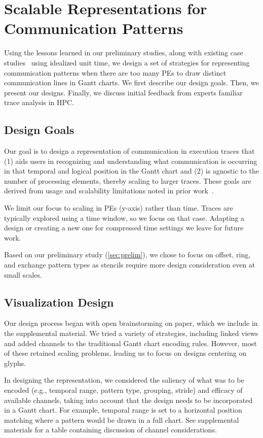\section{Scalable Representations for Communication Patterns}
\label{sec:design}

Using the lessons learned in our preliminary studies, along with existing case studies~\cite{isaacs2014combing, Isaacs2016} using idealized unit time, we design a set of strategies for representing communication patterns when there are too many PEs to draw distinct communication lines in Gantt charts. We first describe our design goals. Then, we present our designs. Finally, we discuss initial feedback from experts familiar trace analysis in HPC.


\subsection{Design Goals}

Our goal is to design a representation of communication in execution traces that (1) aids users in recognizing and understanding what communication is occurring in that temporal and logical position in the Gantt chart and (2) is agnostic to the number of processing elements, thereby scaling to larger traces. These goals are derived from usage and scalability limitations noted in prior work~\cite{isaacs2014combing}. 

We limit our focus to scaling in PEs (y-axis) rather than time. Traces are typically explored using a time window, so we focus on that case. Adapting a design or creating a new one for compressed time settings we leave for future work.

Based on our preliminary study (\autoref{sec:prelim}), we chose to focus on offset, ring, and exchange pattern types as stencils require more design consideration even at small scales. 

\subsection{Visualization Design}

Our design process began with open brainstorming on paper, which we include in the supplemental material. We tried a variety of strategies, including linked views and added channels to the traditional Gantt chart encoding rules. However, most of these retained scaling problems, leading us to focus on designs centering on glyphs.

In designing the representation, we considered the saliency of what was to be encoded (e.g., temporal range, pattern type, grouping, stride) and efficacy of available channels, taking into account that the design needs to be incorporated in a Gantt chart. For example, temporal range is set to a horizontal position matching where a pattern would be drawn in a full chart. See supplemental materials for a table containing discussion of channel considerations.

